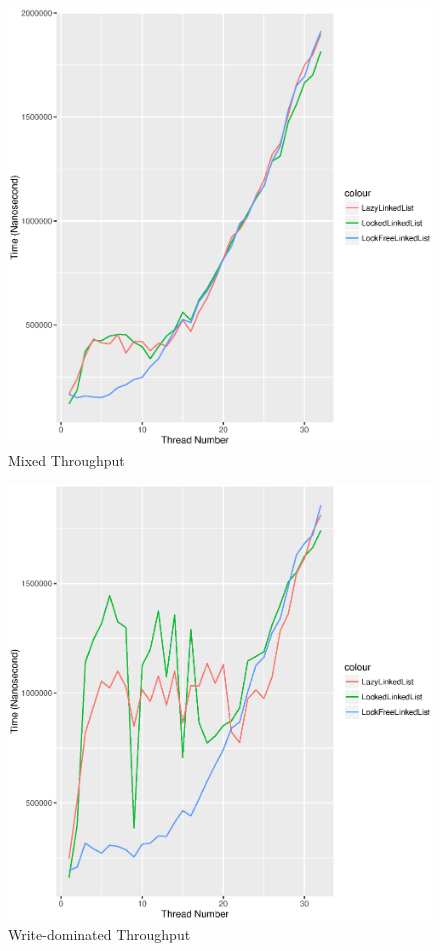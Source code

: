 \documentclass[a4paper]{report}
\begin{document}
\begin{figure}[H]
  \includegraphics[scale=0.8]{result/result-tacc-7796986-mixed}
  \caption{Mixed Throughput}
\end{figure}

\begin{figure}[H]
  \includegraphics[scale=0.8]{result/result-tacc-7796986-write}
  \caption{Write-dominated Throughput}
\end{figure}
\end{document}
